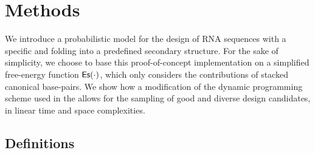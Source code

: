 \section{Methods}
\label{sec:methods}



We introduce a probabilistic model for the design of RNA sequences with a specific \GCContent and folding into a predefined secondary structure.
For the sake of simplicity, we choose to base this proof-of-concept implementation on a simplified free-energy function $\text{{\sf Es}}(\cdot)$, which only considers the contributions of 
stacked canonical base-pairs. We show how a modification of the dynamic programming scheme used in the \RNAmutants allows for the sampling of good and diverse design candidates, in linear time and space complexities.


%
%
\subsection{Definitions}

